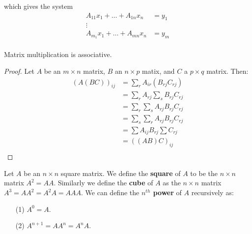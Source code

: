\begin{example}
    which gives the system
        \begin{equation*}
            \begin{align*}
                A_{11}x_1+\dots+A_{1n}x_n &= y_1 \\
                    \vdots    \\
                A_{m_1}x_1+\dots+A_{mn}x_n &= y_m \\
            \end{align*}
        \end{equation*}
\end{example}   

\begin{theorem}\label{3.4.1}
    Matrix multiplication is associative.
\end{theorem}
\begin{proof}
    Let $A$ be an  $m \times n$ matrix,  $B$ an $n \times p$ matix, and  $C$ a $p \times q$ matrix.
    Then:
        \begin{equation*}
            \begin{align*}
                (A(BC))_{ij} &= \sum_{r}{A_{ir}(B_{rj}C_{rj})} \\
                            &= \sum_{r}{A_{rj}}\sum_{s}{B_{rj}C_{rj}} \\
                            &= \sum_{r}{\sum_{s}{A_{rj}B_{rj}C_{rj}}} \\
                            &= \sum_{s}{\sum_{r}{A_{rj}B_{rj}C_{rj}}} \\
                            &= \sum{A_{ij}B_{rj}}\sum{C_{rj}} \\
                            &= ((AB)C)_{ij} \\
            \end{align*}
        \end{equation*}
\end{proof}

\begin{definition}
    Let $A$ be an  $n \times n$ square matrix. We define the \textbf{square} of $A$ to be the  $n
    \times n$ matrix  $A^2=AA$. Similarly we define the \textbf{cube} of $A$ as the  $n \times n$
    matrix  $A^3=AA^2=A^2A=AAA$. We can define the \textbf{$n^{th}$ power} of $A$ recursively as:
        \begin{enumerate}
            \item[(1)] $A^0=A$.

            \item[(2)] $A^{n+1}=AA^n=A^nA$.
        \end{enumerate}
\end{definition}

